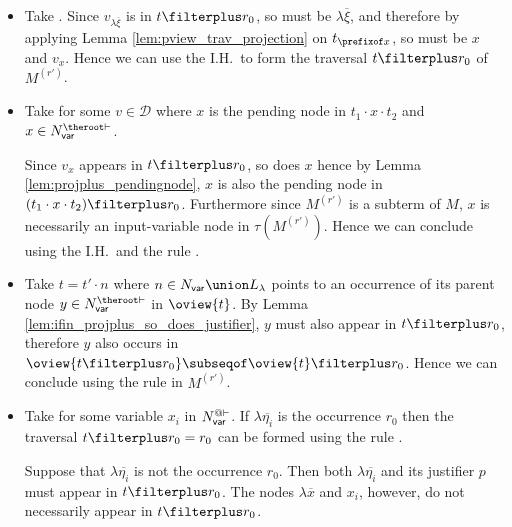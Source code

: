 \begin{itemize}
    \item {} Take .
        Since $v_{\lambda \overline{\xi}}$ is in $t \filterplus
        r_0$, so must be $\lambda \overline{\xi}$, and therefore
        by applying Lemma \ref{lem:pview_trav_projection} on
        $t_{\prefixof x}$, so must be $x$ and $v_x$. Hence we
        can use the I.H.\ to form the traversal $t \filterplus
        r_0$ of $M^{(r')}$.


   \item {} Take  for some
    $v \in \mathcal{D}$ where $x$ is the pending node in $t_1 \cdot x \cdot t_2$ and $x \in N_{\sf var}^{\theroot\vdash}$.

    Since $v_x$ appears in $t\filterplus r_0$, so does $x$ hence
    by Lemma \ref{lem:projplus_pendingnode}, $x$ is also the
    pending node in $(t_1 \cdot x \cdot t_2)\filterplus r_0$.
    Furthermore since $M^{(r')}$ is a subterm of $M$, $x$ is
    necessarily an input-variable node in $\tau(M^{(r')})$.
    Hence we can conclude using the I.H.\ and the rule
    .

    \item {}  Take $t =  t' \cdot n$ where $n \in N_{\sf var}\union L_\lambda$ points to an occurrence of its parent node $y \in N_{\sf var}^{\theroot\vdash}$ in $\oview{t}$.
    By Lemma \ref{lem:ifin_projplus_so_does_justifier}, $y$ must
    also appear in $t\filterplus r_0$, therefore $y$ also occurs
    in $\oview{t\filterplus r_0} \subseqof \oview{t}\filterplus
    r_0$. Hence we can conclude using the rule
     in $M^{(r')}$.


    \item {}
    Take  for some
        variable $x_i$ in $N_{\sf var}^{@\vdash}$.
    If $\lambda \overline{\eta_i}$ is the occurrence $r_0$ then
    the traversal $t\filterplus r_0 = r_0$ can be formed using
    the rule .

    Suppose that $\lambda \overline{\eta_i}$ is not the occurrence $r_0$. Then both $\lambda \overline{\eta_i}$ and its justifier $p$ must appear in $t\filterplus r_0$. The nodes $\lambda
    \overline{x}$ and $x_i$, however, do not necessarily appear in    $t\filterplus r_0$.


\end{itemize}
